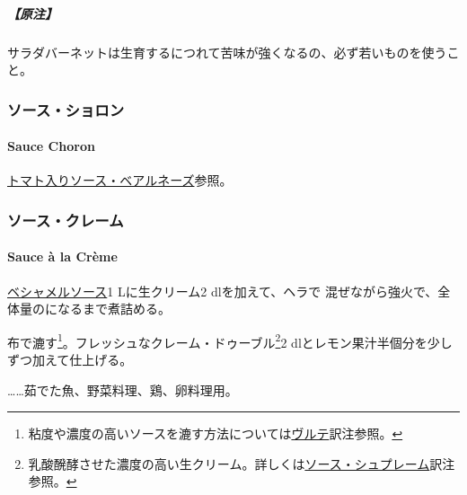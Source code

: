 \begin{recette}
\hypertarget{ux539fux6ce8-5}{%
\subparagraph{【原注】}\label{ux539fux6ce8-5}}

サラダバーネットは生育するにつれて苦味が強くなるの、必ず若いものを使うこと。

\maeaki

\hypertarget{ux30bdux30fcux30b9ux30b7ux30e7ux30edux30f3}{%
\subsubsection{ソース・ショロン}\label{ux30bdux30fcux30b9ux30b7ux30e7ux30edux30f3}}

\hypertarget{sauce-choron}{%
\paragraph{Sauce Choron}\label{sauce-choron}}

\protect\hyperlink{sauce-bearnaise-tomatee}{トマト入りソース・ベアルネーズ}参照。

\maeaki

\hypertarget{ux30bdux30fcux30b9ux30afux30ecux30fcux30e0}{%
\subsubsection{ソース・クレーム}\label{ux30bdux30fcux30b9ux30afux30ecux30fcux30e0}}

\hypertarget{sauce-creme}{%
\paragraph{Sauce à la Crème}\label{sauce-creme}}


\protect\hyperlink{sauce-bechamel}{ベシャメルソース}1 Lに生クリーム2
dlを加えて、ヘラで
混ぜながら強火で、全体量の\troisquarts{}になるまで煮詰める。

布で漉す\footnote{粘度や濃度の高いソースを漉す方法については\protect\hyperlink{veloute}{ヴルテ}訳注参照。}。フレッシュなクレーム・ドゥーブル\footnote{乳酸醗酵させた濃度の高い生クリーム。詳しくは\protect\hyperlink{sauce-supreme}{ソース・シュプレーム}訳注参照。}2\undemi{}
dlとレモン果汁半個分を少しずつ加えて仕上げる。

\ldots{}\ldots{}茹でた魚、野菜料理、鶏、卵料理用。

\maeaki


\end{recette}
